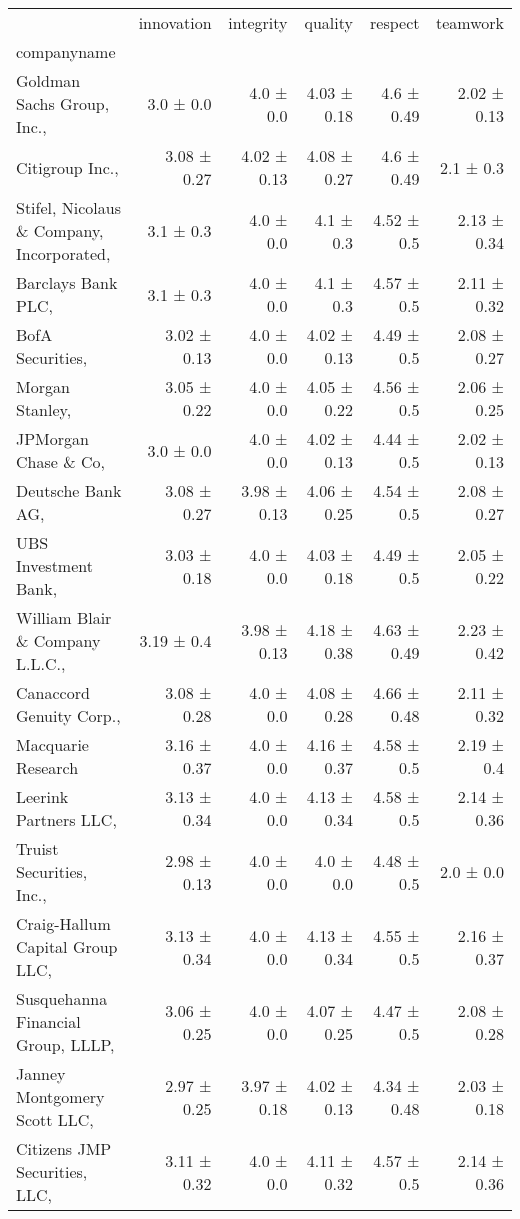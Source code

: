 \begin{tabular}{lrrrrr}
\toprule
 & innovation & integrity & quality & respect & teamwork \\
companyname &  &  &  &  &  \\
\midrule
Goldman Sachs Group, Inc.,  & 3.0 ± 0.0 & 4.0 ± 0.0 & 4.03 ± 0.18 & 4.6 ± 0.49 & 2.02 ± 0.13 \\
Citigroup Inc.,  & 3.08 ± 0.27 & 4.02 ± 0.13 & 4.08 ± 0.27 & 4.6 ± 0.49 & 2.1 ± 0.3 \\
Stifel, Nicolaus \& Company, Incorporated,  & 3.1 ± 0.3 & 4.0 ± 0.0 & 4.1 ± 0.3 & 4.52 ± 0.5 & 2.13 ± 0.34 \\
Barclays Bank PLC,  & 3.1 ± 0.3 & 4.0 ± 0.0 & 4.1 ± 0.3 & 4.57 ± 0.5 & 2.11 ± 0.32 \\
BofA Securities,  & 3.02 ± 0.13 & 4.0 ± 0.0 & 4.02 ± 0.13 & 4.49 ± 0.5 & 2.08 ± 0.27 \\
Morgan Stanley,  & 3.05 ± 0.22 & 4.0 ± 0.0 & 4.05 ± 0.22 & 4.56 ± 0.5 & 2.06 ± 0.25 \\
JPMorgan Chase \& Co,  & 3.0 ± 0.0 & 4.0 ± 0.0 & 4.02 ± 0.13 & 4.44 ± 0.5 & 2.02 ± 0.13 \\
Deutsche Bank AG,  & 3.08 ± 0.27 & 3.98 ± 0.13 & 4.06 ± 0.25 & 4.54 ± 0.5 & 2.08 ± 0.27 \\
UBS Investment Bank,  & 3.03 ± 0.18 & 4.0 ± 0.0 & 4.03 ± 0.18 & 4.49 ± 0.5 & 2.05 ± 0.22 \\
William Blair \& Company L.L.C.,  & 3.19 ± 0.4 & 3.98 ± 0.13 & 4.18 ± 0.38 & 4.63 ± 0.49 & 2.23 ± 0.42 \\
Canaccord Genuity Corp.,  & 3.08 ± 0.28 & 4.0 ± 0.0 & 4.08 ± 0.28 & 4.66 ± 0.48 & 2.11 ± 0.32 \\
Macquarie Research & 3.16 ± 0.37 & 4.0 ± 0.0 & 4.16 ± 0.37 & 4.58 ± 0.5 & 2.19 ± 0.4 \\
Leerink Partners LLC,  & 3.13 ± 0.34 & 4.0 ± 0.0 & 4.13 ± 0.34 & 4.58 ± 0.5 & 2.14 ± 0.36 \\
Truist Securities, Inc.,  & 2.98 ± 0.13 & 4.0 ± 0.0 & 4.0 ± 0.0 & 4.48 ± 0.5 & 2.0 ± 0.0 \\
Craig-Hallum Capital Group LLC,  & 3.13 ± 0.34 & 4.0 ± 0.0 & 4.13 ± 0.34 & 4.55 ± 0.5 & 2.16 ± 0.37 \\
Susquehanna Financial Group, LLLP,  & 3.06 ± 0.25 & 4.0 ± 0.0 & 4.07 ± 0.25 & 4.47 ± 0.5 & 2.08 ± 0.28 \\
Janney Montgomery Scott LLC,  & 2.97 ± 0.25 & 3.97 ± 0.18 & 4.02 ± 0.13 & 4.34 ± 0.48 & 2.03 ± 0.18 \\
Citizens JMP Securities, LLC,  & 3.11 ± 0.32 & 4.0 ± 0.0 & 4.11 ± 0.32 & 4.57 ± 0.5 & 2.14 ± 0.36 \\

\end{tabular}
